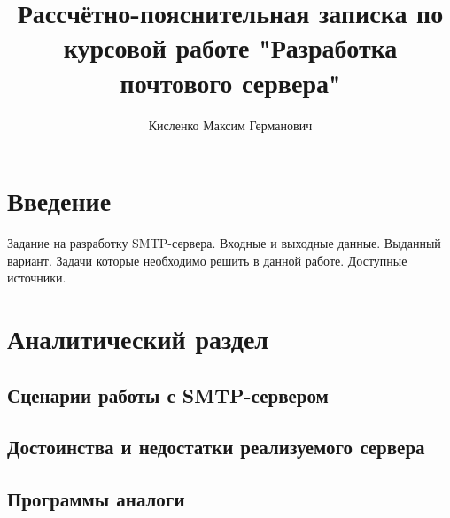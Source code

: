 \documentclass[a4paper,12pt]{report}
\title{Рассчётно-пояснительная записка по курсовой работе "Разработка почтового сервера"}
\author{Кисленко Максим Германович}
\begin{document}
\maketitle

\tableofcontents

\cleardoublepage
{}
{}
\chapter*{Введение}



Задание на разработку SMTP-сервера.
Входные и выходные данные.
Выданный вариант.
Задачи которые необходимо решить в данной работе.
Доступные источники.




\chapter{Аналитический раздел}

\section{Сценарии работы с SMTP-сервером}

\section{Достоинства и недостатки реализуемого сервера}

\section{Программы аналоги}
\end{document}
